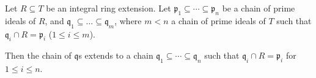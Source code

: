Let $R \subseteq T$ be an integral ring extension. Let
$\mathfrak{p}_1 \subseteq \cdots \subseteq \mathfrak{p}_n$
be a chain of prime ideals of $R$, and
$\mathfrak{q}_1 \subseteq \ldots \subseteq \mathfrak{q}_m$,
where $m  < n$ a chain of prime ideals of $T$ such that
$\mathfrak{q}_i \cap R = \mathfrak{p}_i$ ($1 \leq i\leq m$).

Then the chain of $\mathfrak{q}$s extends to a chain
$\mathfrak{q}_1 \subseteq \cdots \subseteq \mathfrak{q}_n$ such
that $\mathfrak{q}_i\cap R = \mathfrak{p}_i$ for $1\leq i\leq n$.
